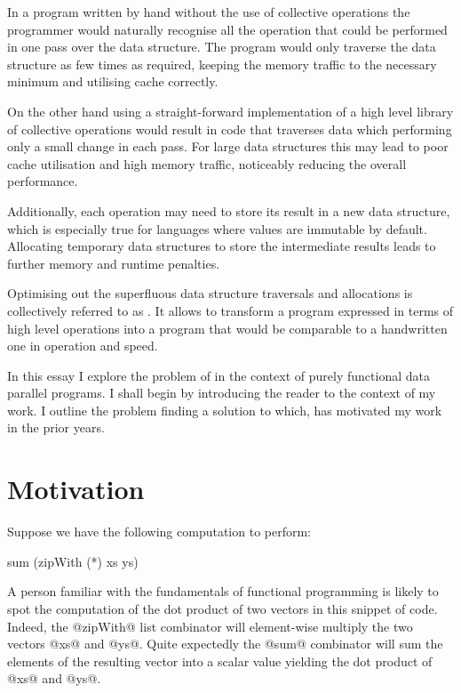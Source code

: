 \documentclass[preamble.tex]{subfiles}
\begin{document}
In a program written by hand without the use of collective operations the programmer would naturally recognise all the operation that could be performed in one pass over the data structure. The program would only traverse the data structure as few times as required, keeping the memory traffic to the necessary minimum and utilising cache correctly.

On the other hand using a straight-forward implementation of a high level library of collective operations would result in code that traverses data which performing only a small change in each pass. For large data structures this may lead to poor cache utilisation and high memory traffic, noticeably reducing the overall performance.

Additionally, each operation may need to store its result in a new data structure, which is especially true for languages where values are immutable by default. Allocating temporary data structures to store the intermediate results leads to further memory and runtime penalties.

Optimising out the superfluous data structure traversals and allocations is collectively referred to as \ifusion{}. It allows to transform a program expressed in terms of high level operations into a program that would be comparable to a handwritten one in operation and speed.

In this essay I explore the problem of  in the context of purely functional data parallel programs. I shall begin by introducing the reader to the context of my work. I outline the problem finding a solution to which, has motivated my work in the prior years.

\clearpage


\section{Motivation}

Suppose we have the following computation to perform:

\begin{hscode}
sum (zipWith (*) xs ys)
\end{hscode}

A person familiar with the fundamentals of functional programming is likely to spot the computation of the dot product of two vectors in this snippet of \Haskell code. Indeed, the @zipWith@ list combinator\icomb{} will element-wise multiply the two vectors @xs@ and @ys@. Quite expectedly the @sum@ combinator will sum the elements of the resulting vector into a scalar value yielding the dot product of @xs@ and @ys@.
\end{document}
